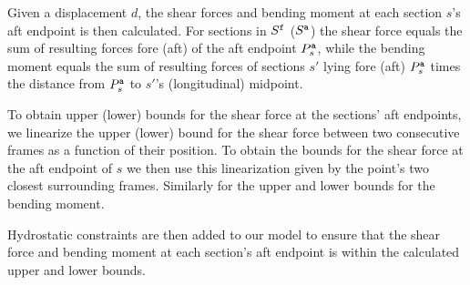 Given a displacement $d$, the shear forces and bending moment at each section $s$'s aft endpoint is then calculated. For sections in $S^{\texttt{f}}$ ($S^{\texttt{a}}$) the shear force  equals the sum of resulting forces fore (aft) of the aft endpoint $P^{\texttt{a}}_s$, while the bending moment equals the sum of resulting forces of sections $s'$ lying fore (aft) $P^{\texttt{a}}_s$ times the distance from $P^{\texttt{a}}_s$ to $s'$'s (longitudinal) midpoint.

To obtain upper (lower) bounds for the shear force at the sections' aft endpoints,  
we linearize the upper (lower) bound for the shear force between two consecutive frames as a function of their position. To obtain the bounds for the shear force at the aft endpoint of $s$ we then use this linearization given by the point's two closest surrounding frames. Similarly for the upper and lower bounds for the bending moment.

Hydrostatic constraints are then added to our model to ensure that the shear force and bending moment at each section's aft endpoint is within the calculated upper and lower bounds.

%

